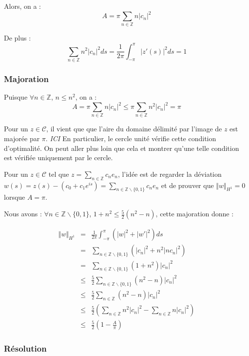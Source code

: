 \documentclass[10pt,a4paper]{article}
\newcommand{\Z}{\mathbb{Z}}
\theoremstyle{plain}
\theoremstyle{definition}
\begin{document}
Alors, on a :
\[ A =  \pi \sum_{n\in \Z}{ n |c_n|^2} \]

De plus :
\[ \sum_{n\in \Z}{n^2|c_n|^2} ds = \frac{1}{2\pi} \int_{-\pi}^{\pi}{|z'(s)|^2ds} = 1 \]

\subsubsection{Majoration}

Puisque $\forall n \in \Z$, $n \leqslant n^2$, on a :
\[ A = \pi \sum_{n\in \Z}{n|c_n|^2} \leqslant \pi \sum_{n\in \Z}{n^2|c_n|^2} = \pi  \]

Pour un $z \in \mathcal{C}$, il vient que que l'aire du domaine délimité par l'image de $z$ est majorée par $\pi$. \emph{ICI} En particulier, le cercle unité vérifie cette condition d'optimalité. On peut aller plus loin que cela et montrer qu'une telle condition est vérifiée uniquement par le cercle.


Pour un $z \in \mathcal{C}$ tel que $z=\sum_{n\in \Z}{c_ne_n}$, l'idée est de regarder la déviation $w(s) = z(s) - (c_0+c_1e^{is}) = \sum_{n\in \Z\backslash \{0,1\}}{c_ne_n}$ et de prouver que $\Vert w\Vert_{H^1} = 0$ lorsque $A=\pi$.

Nous avons : $\forall n \in \Z \backslash \{0,1\}$, $1+n^2 \leqslant \frac{5}{2} (n^2-n)$, cette majoration donne :

\begin{eqnarray*}
\Vert w\Vert_{H^1} &=& \frac{1}{2\pi} \int_{-\pi}^{\pi}{ (|w|^2+|w'|^2)ds} \\
&=& \sum_{n\in \Z\backslash \{0,1\}}{(|c_n|^2+ n^2|nc_n|^2)} \\
&=& \sum_{n\in \Z\backslash \{0,1\}}{(1+n^2) |c_n|^2 } \\
&\leqslant& \frac{5}{2} \sum_{n\in \Z\backslash \{0,1\}}{(n^2-n) |c_n|^2 } \\
&\leqslant& \frac{5}{2} \sum_{n\in \Z}{(n^2-n) |c_n|^2 } \\
&\leqslant& \frac{5}{2} \left(\sum_{n\in \Z}{n^2|c_n|^2} - \sum_{n\in \Z}{n|c_n|^2 } \right) \\
&\leqslant& \frac{5}{2} \left(1 - \frac{A}{\pi}\right)
\end{eqnarray*}

\subsubsection{Résolution}
\end{document}
